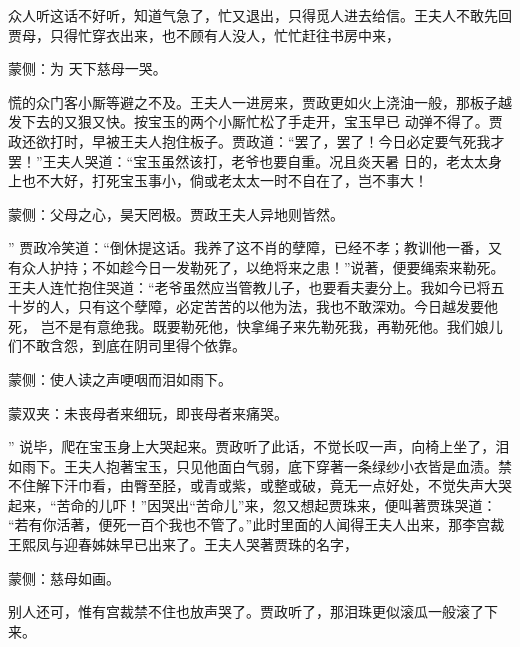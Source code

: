 \begin{parag}
    众人听这话不好听，知道气急了，忙又退出，只得觅人进去给信。王夫人不敢先回贾母，只得忙穿衣出来，也不顾有人没人，忙忙赶往书房中来，\begin{note}蒙侧：为 天下慈母一哭。\end{note}慌的众门客小厮等避之不及。王夫人一进房来，贾政更如火上浇油一般，那板子越发下去的又狠又快。按宝玉的两个小厮忙松了手走开，宝玉早已 动弹不得了。贾政还欲打时，早被王夫人抱住板子。贾政道：“罢了，罢了！今日必定要气死我才罢！”王夫人哭道：“宝玉虽然该打，老爷也要自重。况且炎天暑 日的，老太太身上也不大好，打死宝玉事小，倘或老太太一时不自在了，岂不事大！\begin{note}蒙侧：父母之心，昊天罔极。贾政王夫人异地则皆然。\end{note}” 贾政冷笑道：“倒休提这话。我养了这不肖的孽障，已经不孝；教训他一番，又有众人护持；不如趁今日一发勒死了，以绝将来之患！”说著，便要绳索来勒死。王夫人连忙抱住哭道：“老爷虽然应当管教儿子，也要看夫妻分上。我如今已将五十岁的人，只有这个孽障，必定苦苦的以他为法，我也不敢深劝。今日越发要他死， 岂不是有意绝我。既要勒死他，快拿绳子来先勒死我，再勒死他。我们娘儿们不敢含怨，到底在阴司里得个依靠。\begin{note}蒙侧：使人读之声哽咽而泪如雨下。\end{note}\begin{note}蒙双夹：未丧母者来细玩，即丧母者来痛哭。\end{note}” 说毕，爬在宝玉身上大哭起来。贾政听了此话，不觉长叹一声，向椅上坐了，泪如雨下。王夫人抱著宝玉，只见他面白气弱，底下穿著一条绿纱小衣皆是血渍。禁不住解下汗巾看，由臀至胫，或青或紫，或整或破，竟无一点好处，不觉失声大哭起来，“苦命的儿吓！”因哭出“苦命儿”来，忽又想起贾珠来，便叫著贾珠哭道： “若有你活著，便死一百个我也不管了。”此时里面的人闻得王夫人出来，那李宫裁王熙凤与迎春姊妹早已出来了。王夫人哭著贾珠的名字，\begin{note}蒙侧：慈母如画。\end{note}别人还可，惟有宫裁禁不住也放声哭了。贾政听了，那泪珠更似滚瓜一般滚了下来。
\end{parag}


